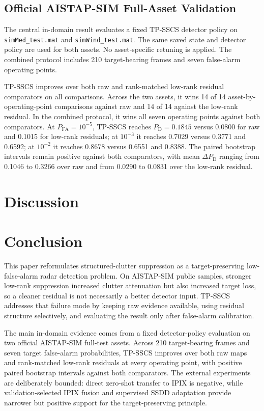 \documentclass[journal]{IEEEtran}
\begin{document}
\subsection{Official AISTAP-SIM Full-Asset Validation}

The central in-domain result evaluates a fixed TP-SSCS detector policy on \texttt{simMed\_test.mat} and \texttt{simWind\_test.mat}. The same saved state and detector policy are used for both assets. No asset-specific retuning is applied. The combined protocol includes 210 target-bearing frames and seven false-alarm operating points.

TP-SSCS improves over both raw and rank-matched low-rank residual comparators on all comparisons. Across the two assets, it wins 14 of 14 asset-by-operating-point comparisons against raw and 14 of 14 against the low-rank residual. In the combined protocol, it wins all seven operating points against both comparators. At $P_{\mathrm{FA}}=10^{-5}$, TP-SSCS reaches $P_{\mathrm{D}}=0.1845$ versus 0.0800 for raw and 0.1015 for low-rank residuals; at $10^{-3}$ it reaches 0.7029 versus 0.3771 and 0.6592; at $10^{-2}$ it reaches 0.8678 versus 0.6551 and 0.8388. The paired bootstrap intervals remain positive against both comparators, with mean $\Delta P_{\mathrm{D}}$ ranging from 0.1046 to 0.3266 over raw and from 0.0290 to 0.0831 over the low-rank residual.

\section{Discussion}

\section{Conclusion}

This paper reformulates structured-clutter suppression as a target-preserving low-false-alarm radar detection problem. On AISTAP-SIM public samples, stronger low-rank suppression increased clutter attenuation but also increased target loss, so a cleaner residual is not necessarily a better detector input. TP-SSCS addresses that failure mode by keeping raw evidence available, using residual structure selectively, and evaluating the result only after false-alarm calibration.

The main in-domain evidence comes from a fixed detector-policy evaluation on two official AISTAP-SIM full-test assets. Across 210 target-bearing frames and seven target false-alarm probabilities, TP-SSCS improves over both raw maps and rank-matched low-rank residuals at every operating point, with positive paired bootstrap intervals against both comparators. The external experiments are deliberately bounded: direct zero-shot transfer to IPIX is negative, while validation-selected IPIX fusion and supervised SSDD adaptation provide narrower but positive support for the target-preserving principle.
\end{document}
